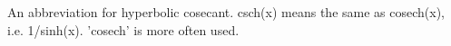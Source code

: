 An abbreviation for hyperbolic cosecant. csch(x) means the same as
cosech(x), i.e. 1/sinh(x). 'cosech' is more often used.